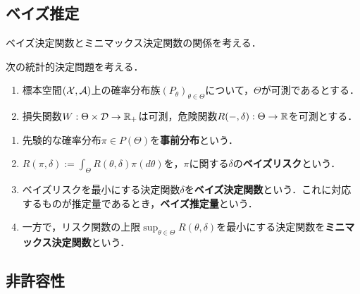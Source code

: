 \documentclass[uplatex,dvipdfmx]{jsreport}
\begin{document}
\begin{theorem}
    
\end{theorem}

\subsection{ベイズ推定}

\begin{tcolorbox}[colframe=ForestGreen, colback=ForestGreen!10!white,breakable,colbacktitle=ForestGreen!40!white,coltitle=black,fonttitle=\bfseries\sffamily,
title=]
    ベイズ決定関数とミニマックス決定関数の関係を考える．
\end{tcolorbox}

\begin{notation}
    次の統計的決定問題を考える．
    \begin{enumerate}
        \item 標本空間$(\mathcal{X},\mathcal{A})$上の確率分布族$(P_\theta)_{\theta\in\Theta}$について，$\Theta$が可測であるとする．
        \item 損失関数$W:\Theta\times\mathcal{D}\to\mathbb{R}_+$は可測，危険関数$R(-,\delta):\Theta\to\mathbb{R}$を可測とする．
    \end{enumerate}
\end{notation}

\begin{definition}\mbox{}
    \begin{enumerate}
        \item 先験的な確率分布$\pi\in P(\Theta)$を\textbf{事前分布}という．
        \item $R(\pi,\delta):=\int_\Theta R(\theta,\delta)\pi(d\theta)$を，$\pi$に関する$\delta$の\textbf{ベイズリスク}という．
        \item ベイズリスクを最小にする決定関数$\delta$を\textbf{ベイズ決定関数}という．これに対応するものが推定量であるとき，\textbf{ベイズ推定量}という．
        \item 一方で，リスク関数の上限$\sup_{\theta\in\Theta}R(\theta,\delta)$を最小にする決定関数を\textbf{ミニマックス決定関数}という．
    \end{enumerate}
\end{definition}

\subsection{非許容性}
\end{document}
